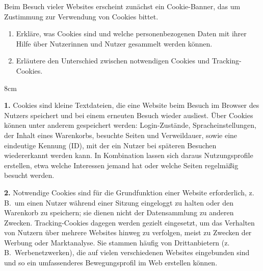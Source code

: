 \question[3]
Beim Besuch vieler Websites erscheint zunächst ein Cookie-Banner, das 
um Zustimmung zur Verwendung von Cookies bittet.

\begin{enumerate}
    \item Erkläre, was Cookies sind und welche personenbezogenen 
    Daten mit ihrer Hilfe über Nutzerinnen und Nutzer gesammelt werden 
    können.
    \item Erläutere den Unterschied zwischen notwendigen Cookies und 
    Tracking-Cookies.
\end{enumerate}

\begin{solutionbox}{8cm}

\textbf{1.} Cookies sind kleine Textdateien, die eine Website beim 
Besuch im Browser des Nutzers speichert und bei einem erneuten Besuch 
wieder ausliest. Über Cookies können unter anderem gespeichert werden: 
Login-Zustände, Spracheinstellungen, der Inhalt eines Warenkorbs, 
besuchte Seiten und Verweildauer, sowie eine eindeutige Kennung (ID), 
mit der ein Nutzer bei späteren Besuchen wiedererkannt werden kann. In 
Kombination lassen sich daraus Nutzungsprofile erstellen, etwa welche 
Interessen jemand hat oder welche Seiten regelmäßig besucht werden.

\textbf{2.} Notwendige Cookies sind für die Grundfunktion einer 
Website erforderlich, z.\,B.\ um einen Nutzer während einer Sitzung 
eingeloggt zu halten oder den Warenkorb zu speichern; sie dienen nicht 
der Datensammlung zu anderen Zwecken. Tracking-Cookies dagegen werden 
gezielt eingesetzt, um das Verhalten von Nutzern über mehrere Websites 
hinweg zu verfolgen, meist zu Zwecken der Werbung oder Marktanalyse. 
Sie stammen häufig von Drittanbietern (z.\,B.\ Werbenetzwerken), die 
auf vielen verschiedenen Websites eingebunden sind und so ein 
umfassenderes Bewegungsprofil im Web erstellen können.

\end{solutionbox}


